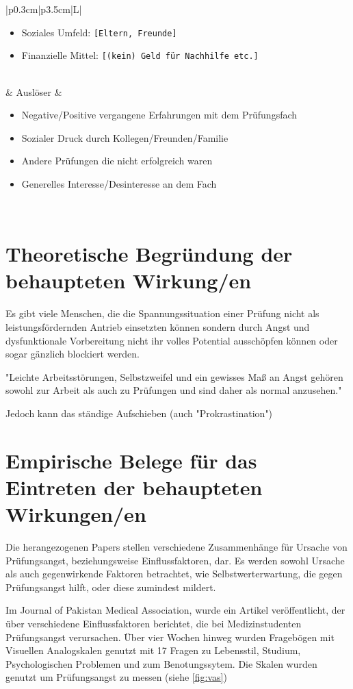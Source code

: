 \documentclass[11pt, a4paper]{article}
\begin{document}
\begin{table}[h!]
\begin{tabularx}{\textwidth}{|p{0.3cm}|p{3.5cm}|L|}
\begin{itemize}[noitemsep, topsep=0pt]
			\item Soziales Umfeld: \texttt{[Eltern, Freunde]}
			\item Finanzielle Mittel: \texttt{[(kein) Geld für Nachhilfe etc.]}
		\end{itemize} \\
		 & Auslöser                               & 
		\begin{itemize}[noitemsep, topsep=0pt]
			\item Negative/Positive vergangene Erfahrungen mit dem Prüfungsfach
			\item Sozialer Druck durch Kollegen/Freunden/Familie
			\item Andere Prüfungen die nicht erfolgreich waren
			\item Generelles Interesse/Desinteresse an dem Fach
		\end{itemize} \\
		\hline
	\end{tabularx}
\end{table}
\newpage
\section*{Theoretische Begründung der behaupteten Wirkung/en}
Es gibt viele Menschen, die die Spannungssituation einer Prüfung nicht als leistungsfördernden Antrieb einsetzten können sondern durch Angst und dysfunktionale Vorbereitung nicht ihr volles Potential ausschöpfen können oder sogar gänzlich blockiert werden. \cite{Holm-Hadulla2009}

"Leichte Arbeitsstörungen, Selbstzweifel und ein gewisses Maß an Angst gehören sowohl zur Arbeit als auch zu Prüfungen und sind daher als normal anzusehen." \cite{Holm-Hadulla2009}

Jedoch kann das ständige Aufschieben (auch "Prokrastination")

\newpage
\section*{Empirische Belege für das Eintreten der behaupteten Wirkungen/en}

	Die herangezogenen Papers stellen verschiedene Zusammenhänge für Ursache von\\ Prüfungsangst, beziehungsweise Einflussfaktoren, dar. Es werden sowohl Ursache als auch gegenwirkende Faktoren betrachtet, wie Selbstwerterwartung, die gegen Prüfungsangst hilft, oder diese zumindest mildert.

	Im Journal of Pakistan Medical Association, wurde ein Artikel veröffentlicht, der über verschiedene Einflussfaktoren berichtet, die bei Medizinstudenten Prüfungsangst verursachen. Über vier Wochen hinweg wurden Fragebögen mit Visuellen Analogskalen genutzt mit 17 Fragen zu Lebensstil, Studium, Psychologischen Problemen und zum Benotungssytem. Die Skalen wurden genutzt um Prüfungsangst zu messen (siehe \cref{fig:vas}) \cite{hashmat2008factors}
\end{document}
